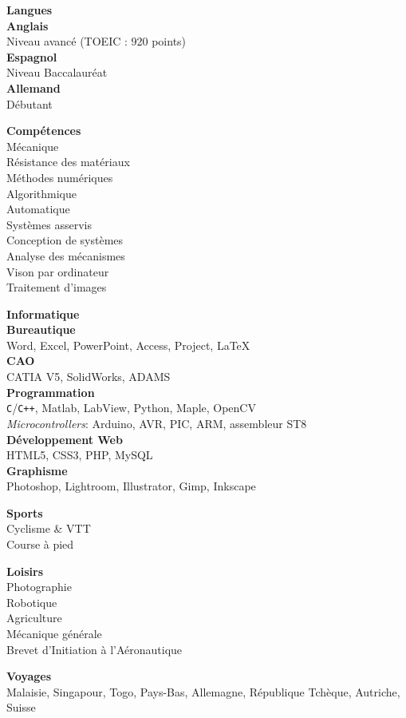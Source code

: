 \documentclass[a4paper,11pt,final]{memoir}
\newcommand{\Sep}{\vspace{1.5em}}
\newcommand{\SmallSep}{\vspace{0.5em}}
\newcommand{\SkillSection}[1]
	{\small{\textbf{#1\\}}\normalfont\footnotesize}
\newcommand{\SkillItem}[1]
	{\textbf{\color{RoyalBlue} #1}\normalfont\\}
\begin{document}
\begin{flushleft}
\SkillSection{Langues}
\SkillItem{Anglais}
Niveau avancé (TOEIC : 920 points)\\
\SkillItem{Espagnol}
Niveau Baccalauréat\\
\SkillItem{Allemand}
Débutant
\Sep

\SkillSection{Compétences}
Mécanique\\
Résistance des matériaux\\
Méthodes numériques\\
Algorithmique\\
Automatique\\
Systèmes asservis\\
Conception de systèmes\\
Analyse des mécanismes\\
Vison par ordinateur\\
Traitement d'images
\Sep

\SkillSection{Informatique}
\SkillItem{Bureautique}
Word, Excel, PowerPoint, Access, Project, \LaTeX\\
\SkillItem{CAO}
CATIA V5, SolidWorks, ADAMS\\
\SkillItem{Programmation}
\verb!C!/\verb!C++!, Matlab, LabView, Python, Maple, OpenCV\\
\emph{Microcontrollers}: Arduino, AVR, PIC, ARM, assembleur ST8\\
\SkillItem{Développement Web}
HTML5, CSS3, PHP, MySQL\\
\SkillItem{Graphisme}
Photoshop, Lightroom, Illustrator, Gimp, Inkscape\\
\Sep

\SkillSection{Sports}
Cyclisme \& VTT\\
Course à pied\\
\SmallSep

\SkillSection{Loisirs}
Photographie\\
Robotique\\
Agriculture\\
Mécanique générale\\
Brevet d'Initiation à l'Aéronautique
\SmallSep

\SkillSection{Voyages}
Malaisie, Singapour, Togo, Pays-Bas, Allemagne, République Tchèque, Autriche, Suisse
\end{flushleft}
\framebreak
\end{document}
